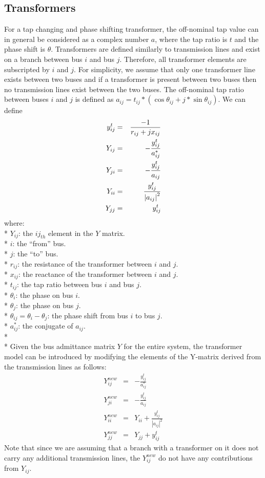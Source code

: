 \documentclass[12pt]{article}
\begin{document}
\subsection*{Transformers}
For a tap changing and phase shifting transformer, the off-nominal tap value can
in general be considered as a complex number $a$, where the tap ratio is $t$
and the phase shift is $\theta$. Transformers are defined similarly to
transmission lines and exist on a branch between bus $i$ and bus $j$.
Therefore, all transformer elements are subscripted by $i$ and $j$. For
simplicity, we assume that only one transformer line exists between two buses
and if a transformer is present between two buses then no transmission lines
exist between the two buses. The off-nominal tap ratio between buses $i$ and $j$
is defined as $a_{ij} = t_{ij}*(\cos{\theta_{ij}}+j*\sin{\theta_{ij}})$.
We can define
\begin{eqnarray}
y_{ij}^{t} &=& \frac{-1}{r_{ij}+j\*x_{ij}} \\
Y_{ij} &=& -\frac{y_{ij}^{t}}{a_{ij}^{*}} \\
Y_{ji} &=& -\frac{y_{ij}^{t}}{a_{ij}} \\
Y_{ii} &=& \frac{y_{ij}^{t}}{{|a_{ij}|}^2} \\
Y_{jj} &=& y_{ij}^{t}
\end{eqnarray} 
where:\\*
$Y_{ij}$: the ${ij}_{th}$ element in the $Y$ matrix.\\* 
$i$: the ``from'' bus.\\*
$j$: the ``to'' bus. \\*
$r_{ij}$: the resistance of the transformer between $i$ and $j$.\\*
$x_{ij}$: the reactance of the transformer between $i$ and $j$.\\*
$t_{ij}$: the tap ratio between bus $i$ and bus $j$.\\*
$\theta_{i}$: the phase on bus $i$.\\*
$\theta_{j}$: the phase on bus $j$.\\*
$\theta_{ij}=\theta_{i}-\theta_{j}$: the phase shift from bus $i$ to bus $j$.\\*
$a_{ij}^*$: the conjugate of $a_{ij}$.\\*
\\*
Given the bus admittance matrix $Y$ for the entire system, the transformer model
can be introduced by modifying the elements of the Y-matrix derived from the
transmission lines as follows:
\begin{eqnarray}
Y_{ij}^{new} &=&  - \frac{y_{ij}^{t}}{a_{ij}^{*}} \\
Y_{ji}^{new} &=&  - \frac{y_{ij}^{t}}{a_{ij}} \\
Y_{ii}^{new} &=& Y_{ii} + \frac{y_{ij}^{t}}{{|a_{ij}|}^2} \\
Y_{jj}^{new} &=& Y_{jj} + y_{ij}^{t}
\end{eqnarray} 
Note that since we are assuming that a branch with a transformer on it does not
carry any additional transmission lines, the $Y_{ij}^{new}$ do not have any
contributions from $Y_{ij}$.
\end{document}
